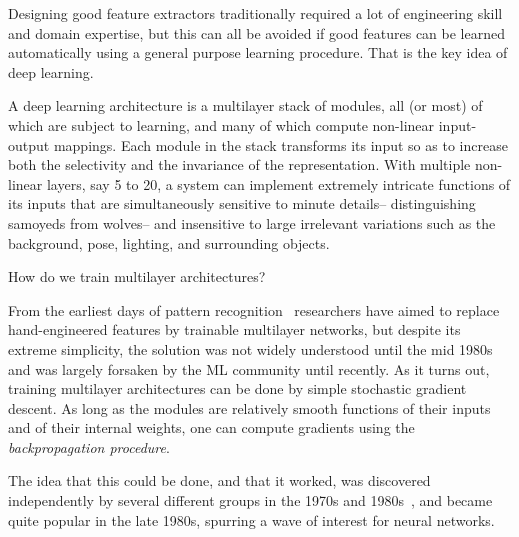\documentclass[10pts]{article}
\begin{document}
Designing good feature extractors traditionally required a lot of
engineering skill and domain expertise, but this can all be avoided if
good features can be learned automatically using a general purpose
learning procedure.  That is the key idea of deep
learning.


A deep learning architecture is a multilayer stack of modules, all (or
most) of which are subject to learning, and many of which compute
non-linear input-output mappings.  Each module in the stack transforms
its input so as to increase both the selectivity and the invariance of
the representation. With multiple non-linear layers, say 5 to 20, a system
can implement extremely intricate functions of its inputs that are
simultaneously sensitive to minute details-- distinguishing samoyeds
from wolves-- and insensitive to large irrelevant variations such as the
background, pose, lighting, and surrounding objects.

How do we train multilayer architectures? 

From the earliest days of pattern
recognition~\citep{selfridge,Rosenblatt57} researchers have aimed to
replace hand-engineered features by trainable multilayer networks,
but despite its extreme simplicity, the solution was not widely
understood until
the mid 1980s and was largely forsaken by the ML community until
recently. As it turns out, training multilayer architectures can be
done by simple stochastic gradient descent. As long as the modules are
relatively smooth functions of their inputs and of their internal
weights, one can compute gradients using the {\em backpropagation
  procedure}.

The idea that this could be done, and that it worked, was discovered independently by
several different groups in the 1970s and
1980s~\citep{Werbos74,Parker85,LeCun85,RHW}, and became quite popular
in the late 1980s, spurring a wave of interest for neural
networks. 
\end{document}
